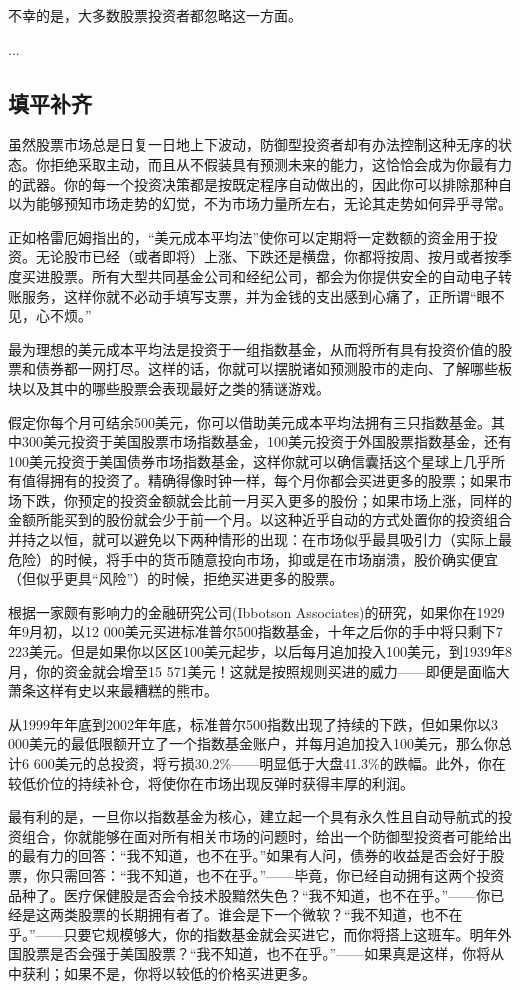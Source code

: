 \documentclass[12pt,oneside]{book}
\begin{document}
不幸的是，大多数股票投资者都忽略这一方面。

...


\subsection{填平补齐}
虽然股票市场总是日复一日地上下波动，防御型投资者却有办法控制这种无序的状态。你拒绝采取主动，而且从不假装具有预测未来的能力，这恰恰会成为你最有力的武器。你的每一个投资决策都是按既定程序自动做出的，因此你可以排除那种自以为能够预知市场走势的幻觉，不为市场力量所左右，无论其走势如何异乎寻常。

正如格雷厄姆指出的，“美元成本平均法”使你可以定期将一定数额的资金用于投资。无论股市已经（或者即将）上涨、下跌还是横盘，你都将按周、按月或者按季度买进股票。所有大型共同基金公司和经纪公司，都会为你提供安全的自动电子转账服务，这样你就不必动手填写支票，并为金钱的支出感到心痛了，正所谓“眼不见，心不烦。”

最为理想的美元成本平均法是投资于一组指数基金，从而将所有具有投资价值的股票和债券都一网打尽。这样的话，你就可以摆脱诸如预测股市的走向、了解哪些板块以及其中的哪些股票会表现最好之类的猜谜游戏。

假定你每个月可结余500美元，你可以借助美元成本平均法拥有三只指数基金。其中300美元投资于美国股票市场指数基金，100美元投资于外国股票指数基金，还有100美元投资于美国债券市场指数基金，这样你就可以确信囊括这个星球上几乎所有值得拥有的投资了。精确得像时钟一样，每个月你都会买进更多的股票；如果市场下跌，你预定的投资金额就会比前一月买入更多的股份；如果市场上涨，同样的金额所能买到的股份就会少于前一个月。以这种近乎自动的方式处置你的投资组合并持之以恒，就可以避免以下两种情形的出现：在市场似乎最具吸引力（实际上最危险）的时候，将手中的货币随意投向市场，抑或是在市场崩溃，股价确实便宜（但似乎更具“风险”）的时候，拒绝买进更多的股票。

根据一家颇有影响力的金融研究公司(Ibbotson Associates)的研究，如果你在1929年9月初，以12 000美元买进标准普尔500指数基金，十年之后你的手中将只剩下7 223美元。但是如果你以区区100美元起步，以后每月追加投入100美元，到1939年8月，你的资金就会增至15 571美元！这就是按照规则买进的威力——即便是面临大萧条这样有史以来最糟糕的熊市。

从1999年年底到2002年年底，标准普尔500指数出现了持续的下跌，但如果你以3 000美元的最低限额开立了一个指数基金账户，并每月追加投入100美元，那么你总计6 600美元的总投资，将亏损30.2\%——明显低于大盘41.3\%的跌幅。此外，你在较低价位的持续补仓，将使你在市场出现反弹时获得丰厚的利润。

最有利的是，一旦你以指数基金为核心，建立起一个具有永久性且自动导航式的投资组合，你就能够在面对所有相关市场的问题时，给出一个防御型投资者可能给出的最有力的回答：“我不知道，也不在乎。”如果有人问，债券的收益是否会好于股票，你只需回答：“我不知道，也不在乎。”——毕竟，你已经自动拥有这两个投资品种了。医疗保健股是否会令技术股黯然失色？“我不知道，也不在乎。”——你已经是这两类股票的长期拥有者了。谁会是下一个微软？“我不知道，也不在乎。”——只要它规模够大，你的指数基金就会买进它，而你将搭上这班车。明年外国股票是否会强于美国股票？“我不知道，也不在乎。”——如果真是这样，你将从中获利；如果不是，你将以较低的价格买进更多。
\end{document}

